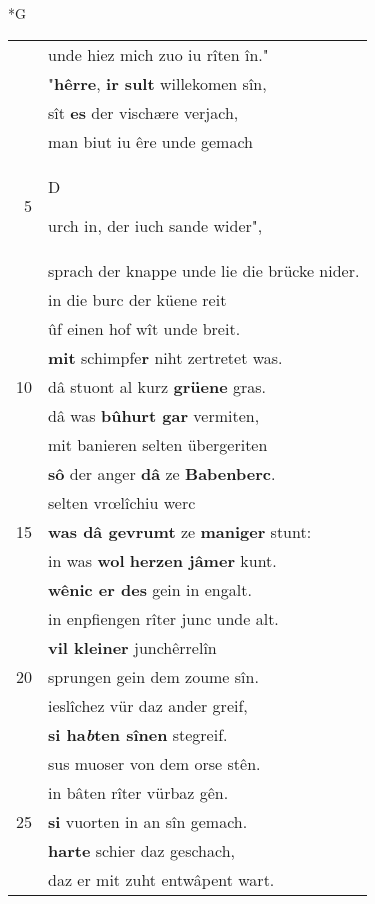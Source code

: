 \documentclass[8pt,a4paper,notitlepage]{article}
\begin{document}
\begin{table}[ht]
\begin{minipage}[t]{0.5\linewidth}
\small
\begin{center}*G
\end{center}
\begin{tabular}{rl}
 & unde hiez mich zuo iu rîten în."\\ 
 & "\textbf{hêrre}, \textbf{ir sult} willekomen sîn,\\ 
 & sît \textbf{es} der vischære verjach,\\ 
 & man biut iu êre unde gemach\\ 
5 & \begin{large}D\end{large}urch in, der iuch sande wider",\\ 
 & sprach der knappe unde lie die brücke nider.\\ 
 & in die burc der küene reit\\ 
 & ûf einen hof wît unde breit.\\ 
 & \textbf{mit} schimpfe\textbf{r} niht zertretet was.\\ 
10 & dâ stuont al kurz \textbf{grüene} gras.\\ 
 & dâ was \textbf{bûhurt gar} vermiten,\\ 
 & mit banieren selten übergeriten\\ 
 & \textbf{sô} der anger \textbf{dâ} ze \textbf{Babenberc}.\\ 
 & selten vrœlîchiu werc\\ 
15 & \textbf{was dâ gevrumt} ze \textbf{maniger} stunt:\\ 
 & in was \textbf{wol} \textbf{herzen jâmer} kunt.\\ 
 & \textbf{wênic er des} gein in engalt.\\ 
 & in enpfiengen rîter junc unde alt.\\ 
 & \textbf{vil kleiner} junchêrrelîn\\ 
20 & sprungen gein dem zoume sîn.\\ 
 & ieslîchez vür daz ander greif,\\ 
 & \textbf{si ha\textit{b}ten sînen} stegreif.\\ 
 & sus muoser von dem orse stên.\\ 
 & in bâten rîter vürbaz gên.\\ 
25 & \textbf{si} vuorten in an sîn gemach.\\ 
 & \textbf{harte} schier daz geschach,\\ 
 & daz er mit zuht entwâpent wart.\\ 

\end{tabular}
\end{minipage}
\end{table}
\end{document}
